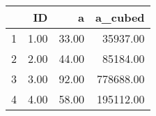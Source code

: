 \begin{table}[ht]
\centering
\begin{tabular}{rrrr}
  \hline
 & ID & a & a\_cubed \\ 
  \hline
1 & 1.00 & 33.00 & 35937.00 \\ 
  2 & 2.00 & 44.00 & 85184.00 \\ 
  3 & 3.00 & 92.00 & 778688.00 \\ 
  4 & 4.00 & 58.00 & 195112.00 \\ 
   \hline
\end{tabular}
\end{table}
